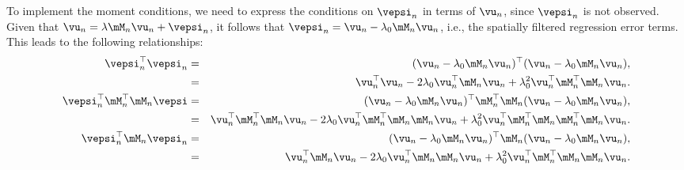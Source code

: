 To implement the moment conditions, we need to express the conditions on $\vepsi_n$ in terms of $\vu_n$, since $\vepsi_n$ is not observed. Given that $\vu_n = \lambda \mM_n\vu_n + \vepsi_n$, it follows that $\vepsi_n = \vu_n - \lambda_0\mM_n\vu_n$, i.e., the spatially filtered regression error terms. This leads to the following relationships:
\begin{eqnarray}
\vepsi^\top_n \vepsi_n & = & (\vu_n - \lambda_0\mM_n\vu_n)^\top(\vu_n - \lambda_0\mM_n\vu_n), \nonumber \\ 
                   & = & \vu^\top_n\vu_n - 2\lambda_0\vu^\top_n\mM_n\vu_n + \lambda^2_0\vu^\top_n\mM^\top_n\mM_n\vu_n \label{eq:mom_1}.\\
\vepsi^\top_n \mM^\top_n\mM_n \vepsi& = &(\vu_n - \lambda_0\mM_n\vu_n)^\top\mM^\top_n\mM_n(\vu_n - \lambda_0\mM_n\vu_n), \nonumber \\
                   &= & \vu^\top_n\mM^\top_n\mM_n\vu_n - 2\lambda_0\vu^\top_n\mM^\top_n\mM_n\mM_n\vu_n + \lambda^2_0\vu^\top_n\mM^\top_n\mM_n\mM^\top_n\mM_n\vu_n. \label{eq:mom_2} \\
\vepsi^\top_n\mM_n\vepsi_n& = &(\vu_n - \lambda_0\mM_n\vu_n)^\top\mM_n(\vu_n - \lambda_0\mM_n\vu_n), \nonumber \\ 
                   &=& \vu^\top_n\mM_n\vu_n - 2\lambda_0\vu^\top_n\mM_n\mM_n\vu_n + \lambda^2_0\vu^\top_n\mM^\top_n\mM_n\mM_n\vu_n. \label{eq:mom_3}
\end{eqnarray}

